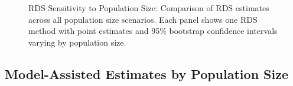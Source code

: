 \documentclass[
  12pt,
  letterpaper,
  DIV=11,
  numbers=noendperiod]{scrartcl}
\theoremstyle{plain}
\theoremstyle{definition}
\begin{document}
\begin{figure}[H]


\caption{\label{fig-rds-sensitivity-popsize}RDS Sensitivity to
Population Size: Comparison of RDS estimates across all population size
scenarios. Each panel shows one RDS method with point estimates and 95\%
bootstrap confidence intervals varying by population size.}

\end{figure}%

\subsection{Model-Assisted Estimates by Population
Size}\label{model-assisted-estimates-by-population-size}
\end{document}
